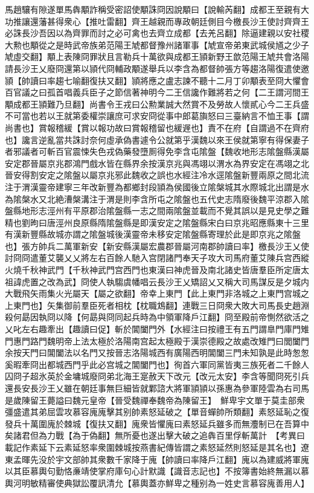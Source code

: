 馬趙驤有隙遂單馬犇顒詐稱受密詔使顒誅冏因說顒曰【說輸芮翻】成都王至親有大功推讓還藩甚得衆心【推吐雷翻】齊王越親而專政朝廷側目今檄長沙王使討齊齊王必誅長沙吾因以為齊罪而討之必可禽也去齊立成都【去羌呂翻】除逼建親以安社稷大勲也顒從之是時武帝族弟范陽王虓都督豫州諸軍事【虓宣帝弟東武城侯馗之少子虓虛交翻】顒上表陳冏罪狀且言勒兵十萬欲與成都王頴新野王歆范陽王虓共會洛陽請長沙王乂廢冏還第以頴代冏輔政顒遂舉兵以李含為都督帥張方等趨洛陽復遣使邀頴【帥讀曰率趨七喻翻復扶又翻】頴將應之盧志諫不聽十二月丁卯顒表至冏大懼會百官議之曰孤首唱義兵臣子之節信著神明今二王信讒作難將若之何【二王謂河間王顒成都王頴難乃旦翻】尚書令王戎曰公勲業誠大然賞不及勞故人懷貳心今二王兵盛不可當也若以王就第委權崇讓庶可求安冏從事中郎葛旟怒曰三臺納言不恤王事【謂尚書也】賞報稽緩【賞以報功故曰賞報稽留也緩遟也】責不在府【自謂過不在齊府也】讒言逆亂當共誅討奈何虛承偽書遽令公就第乎漢魏以來王侯就第寧有得保妻子者邪議者可斬百官震悚失色戎偽藥發墮厠得免李含屯隂盤【魏收地形志隂盤縣漢屬安定郡晉屬京兆郡鴻門戲水皆在縣界余按漢京兆與馮翊以渭水為界安定在馮翊之北晉安得割安定之隂盤以屬京兆邪此魏收之誤也水經注冷水逕隂盤新豐兩原之間北流注于渭漢靈帝建寧三年改新豐為都鄉封段頴為侯國後立隂槃城其水際城北出謂是水為隂槃水又北絶漕槃溝注于渭是則李含所屯之隂盤也五代史志隋廢後魏平涼郡入隂盤縣地形志涇州有平原郡治隂盤縣一志之間兩隂盤並載而不覺其誤以是見史學之難精也劉昫曰唐涇州良原縣隋隂盤縣是即漢安定之隂盤縣宋白曰京兆昭應縣東十三里有漢新豐縣故城亦謂之隂盤城後漢靈帝未移安定隂盤縣寄理於此是即京兆之隂盤也】張方帥兵二萬軍新安【新安縣漢屬宏農郡晉屬河南郡帥讀曰率】檄長沙王乂使討冏冏遣董艾襲乂乂將左右百餘人馳入宫閉諸門奉天子攻大司馬府董艾陳兵宫西縱火燒千秋神武門【千秋神武門宫西門也東漢曰神虎晉及南北諸史皆唐羣臣所定唐太祖諱虎置之改為武】冏使人執騶虞幡唱云長沙王乂矯詔乂又稱大司馬謀反是夕城内大戰飛矢雨集火光屬天【屬之欲翻】帝幸上東門【此上東門非洛城之上東門宫城之上東門也】矢集御前羣臣死者相枕【枕職鴆翻】連戰三日冏衆大敗大司馬長史趙淵殺何勗因執冏以降【何勗與冏同起兵時為中領軍降戶江翻】冏至殿前帝惻然欲活之乂叱左右趣牽出【趣讀曰促】斬於閶闔門外【水經注曰按禮王有五門謂臯門庫門雉門惠門路門魏明帝上法太極於洛陽南宫起太極殿于漢崇德殿之故處改雉門曰閭闔門余按天門曰閶闔法以名門又按晉志洛陽城西有廣陽西明閶闔三門未知孰是此時怱怱奚暇牽冏出都城西門乎此必宫城之閶闔門也】徇首六軍同黨皆夷三族死者二千餘人囚冏子超氷英於金墉城廢冏弟北海王寔赦天下改元【改元太安】李含等聞冏死引兵還長安長沙王乂雖在朝廷事無巨細皆就鄴諮大將軍頴頴以孫惠為參軍陸雲為右司馬　是歲陳留王薨謚曰魏元皇帝【晉受魏禪奉魏帝為陳留王】　鮮卑宇文單于莫圭部衆彊盛遣其弟屈雲攻慕容廆廆擊其别帥素怒延破之【單音蟬帥所類翻】素怒延恥之復發兵十萬圍廆於棘城【復扶又翻】廆衆皆懼廆曰素怒延兵雖多而無灋制已在吾算中矣諸君但為力戰【為于偽翻】無所憂也遂出擊大破之追犇百里俘斬萬計　【考異曰載記作素延下云素延怒率衆圍棘城按燕書紀傳皆謂之素怒延然則怒延是其名也】遼東孟暉先没於宇文部帥其衆數千家降于廆【帥讀曰率降戶江翻】廆以為建威將軍廆以其臣慕輿句勤恪亷靖使掌府庫句心計默識【識音志記也】不按簿書始終無漏以慕輿河明敏精審使典獄訟覆訊清允【慕輿蓋亦鮮卑之種别為一姓史言慕容廆善用人】

